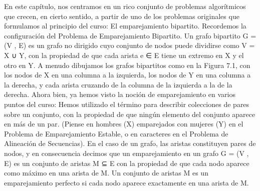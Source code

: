 \documentclass[a4paper, 12pt]{book}
\begin{document}
En este capítulo, nos centramos en un rico conjunto de problemas algorítmicos que crecen, en cierto sentido, a partir de uno de los problemas originales que formulamos al principio del curso: El emparejamiento bipartito.
Recordemos la configuración del Problema de Emparejamiento Bipartito. Un grafo bipartito G = (V , E) es un grafo no dirigido cuyo conjunto de nodos puede dividirse como V = X ∪ Y, con la propiedad de que cada arista e ∈ E tiene un extremo en X y el otro en Y. A menudo dibujamos los grafos bipartitos como en la Figura 7.1, con los nodos de X en una columna a la izquierda, los nodos de Y en una columna a la derecha, y cada arista cruzando de la columna de la izquierda a la de la derecha.
Ahora bien, ya hemos visto la noción de emparejamiento en varios puntos del curso: Hemos utilizado el término para describir colecciones de pares sobre un conjunto, con la propiedad de que ningún elemento del conjunto aparece en más de un par. (Piense en hombres (X) emparejados con mujeres (Y) en el Problema de Emparejamiento Estable, o en caracteres en el Problema de Alineación de Secuencias). En el caso de un grafo, las aristas constituyen pares de nodos, y en consecuencia decimos que un emparejamiento en un grafo G = (V , E) es un conjunto de aristas M ⊆ E con la propiedad de que cada nodo aparece como máximo en una arista de M. Un conjunto de aristas M es un emparejamiento perfecto si cada nodo aparece exactamente en una arista de M.

\end{document}
